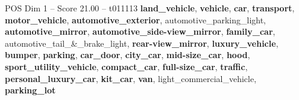 \begin{textsample}{POS Dim 1 – Score 21.00 – t011113}  \label{ex:f1_pos_013}
\textbf{land\_vehicle}, \textbf{vehicle}, \textbf{car}, \textbf{transport}, \textbf{motor\_vehicle}, \textbf{automotive\_exterior}, automotive\_parking\_light, \textbf{automotive\_mirror}, \textbf{automotive\_side-view\_mirror}, \textbf{family\_car}, automotive\_tail\_\&\_brake\_light, \textbf{rear-view\_mirror}, \textbf{luxury\_vehicle}, \textbf{bumper}, \textbf{parking}, \textbf{car\_door}, \textbf{city\_car}, \textbf{mid-size\_car}, \textbf{hood}, \textbf{sport\_utility\_vehicle}, \textbf{compact\_car}, \textbf{full-size\_car}, \textbf{traffic}, \textbf{personal\_luxury\_car}, \textbf{kit\_car}, \textbf{van}, light\_commercial\_vehicle, \textbf{parking\_lot}

\end{textsample}
